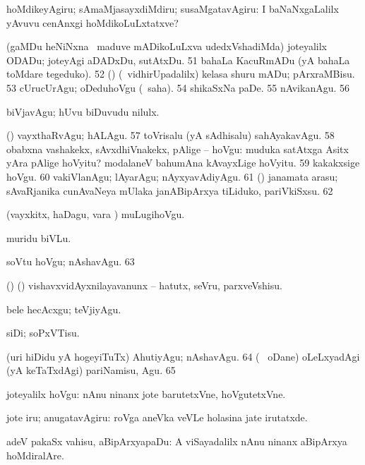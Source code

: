 {{ hoMdikeyAgiru; sAmaMjasayxdiMdiru; susaMgatavAgiru:
 I baNaNxgaLalilx yAvuvu cenAnxgi
hoMdikoLuLxtatxve? 

 (gaMDu heNiNxna \vi\ maduve mADikoLuLxva udedxVshadiMda)
joteyalilx ODADu; joteyAgi aDADxDu, sutAtxDu. 
\num{51}  bahaLa KacuRmADu (yA bahaLa toMdare tegeduko).
\num{52}  (\AmA) (\kanmu\ vidhirUpadalilx) kelasa shuru mADu;
pArxraMBisu. 
\num{53}  cUrucUrAgu; oDeduhoVgu (\rUpa\ saha).
\num{54}  shikaSxNa paDe. 
\num{55}  nAvikanAgu.
\num{56}  

 biVjavAgu; hUvu biDuvudu nilulx. 

 (\rUpa) vayxthaRvAgu; hALAgu. 
\num{57} 
toVrisalu (yA sAdhisalu) sahAyakavAgu. 
\num{58}  obabxna
vashakekx, sAvxdhiVnakekx, pAlige -- hoVgu:  muduka satAtxga Asitx yAra pAlige hoVyitu?  modalaneV bahumAna kAvayxLige hoVyitu. 
\num{59}  kakakxsige hoVgu. 
\num{60}  vakiVlanAgu; lAyarAgu;
nAyxyavAdiyAgu. 
\num{61}  (\birx) janamata arasu; 
sAvaRjanika cunAvaNeya mUlaka janABipArxya tiLiduko, pariVkiSxsu. 
\num{62}  

 (vayxkitx, haDagu, \mo vara \vi) muLugihoVgu.

 muridu biVLu.

 soVtu hoVgu; nAshavAgu. 
\num{63}  

 (\birx) (\AmA) vishavxvidAyxnilayavanunx -- hatutx, seVru, parxveVshisu. 

 bele hecAcxgu; teVjiyAgu. 

 siDi; soPxVTisu. 

 (uri hiDidu yA hogeyiTuTx) AhutiyAgu; nAshavAgu. 
\num{64}  (\sA\  oDane) oLeLxyadAgi
(yA keTaTxdAgi) pariNamisu, Agu. 
\num{65}  

 joteyalilx hoVgu:  nAnu ninanx jote barutetxVne, hoVgutetxVne. 

 jote iru; anugatavAgiru:  roVga aneVka
veVLe holasina jate irutatxde. 

 adeV pakaSx vahisu, aBipArxyapaDu:
 A viSayadalilx nAnu ninanx aBipArxya hoMdiralAre. 

}}
